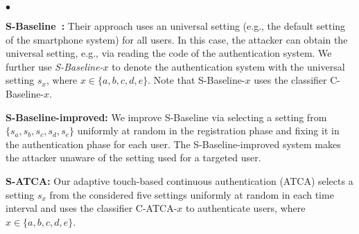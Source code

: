 \documentclass{sig-alternate-05-2015}
\newenvironment{packeditemize}{\begin{list}{$\bullet$}{\setlength{\itemsep}{2pt}\addtolength{\labelwidth}{4pt}\setlength{\leftmargin}{20pt}\setlength{\listparindent}{\parindent}\setlength{\parsep}{0pt}\setlength{\topsep}{0pt}}}{\end{list}}
\begin{document}
\begin{packeditemize}

\item {\bf S-Baseline~\cite{frank2013touchalytics, li2013unobservable,
attack-CCS13}:}  Their approach uses an universal setting (e.g., the default
setting of the smartphone system) for all users. In this case, the attacker can
obtain the universal setting, e.g., via reading the code of the authentication
system. We further use \emph{S-Baseline-$x$} to denote the
authentication system with the universal setting $s_x$, where $x\in\{a, b, c,d,e\}$.
Note that S-Baseline-$x$ uses the classifier C-Baseline-$x$.  

\item {\bf S-Baseline-improved:} We improve S-Baseline via selecting a setting
from $\{s_a,s_b,s_c,s_d,s_e\}$ uniformly at random in the registration phase and fixing it
in the authentication phase for each user. The S-Baseline-improved
 system makes the attacker unaware of the setting used for a
targeted user. 


\item {\bf S-ATCA:} Our adaptive touch-based continuous authentication (ATCA)
selects a setting $s_x$ from the considered five settings uniformly at random in each time
interval and uses the classifier  C-ATCA-$x$ to authenticate users, where
$x\in\{a,b,c,d,e\}$.  

\end{packeditemize}
\end{document}
